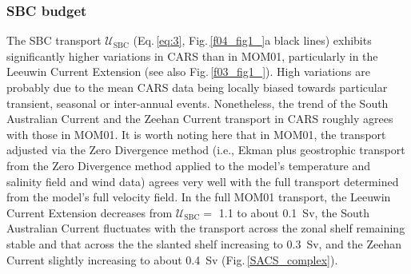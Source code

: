 \documentclass[preprint,3p,review,12pt]{elsarticle}
\newcommand{\sub}[1]{_{\text{#1}}}
\begin{document}
\subsubsection{SBC budget}\label{SBC budget}
The SBC transport $\mathcal{U}\sub{SBC}$ (Eq.\,\ref{eq:3}, Fig.\,\ref{f04_fig1_}a black lines) exhibits significantly higher variations in CARS than in MOM01, particularly in the Leeuwin Current Extension (see also Fig.\,\ref{f03_fig1_}).
High variations are probably due to the mean CARS data being locally biased towards particular transient, seasonal or inter-annual events. Nonetheless, the trend of the South Australian Current and the Zeehan Current transport in CARS
roughly agrees with those in MOM01. It is worth noting here that in MOM01, the transport adjusted via the Zero Divergence method (i.e., Ekman plus geostrophic transport from the Zero Divergence method applied to the model's temperature and salinity field and wind data) agrees very well with the full transport determined from the model's full velocity field. In the full MOM01 transport, the Leeuwin Current Extension decreases from $\mathcal{U}\sub{SBC} =$ \num{1.1} to about \SI{0.1}{Sv}, the South Australian Current fluctuates with the transport across the zonal shelf remaining stable and that across the the slanted shelf increasing to \SI{0.3}{Sv}, and the Zeehan Current slightly increasing to about \SI{0.4}{Sv} (Fig.\,\ref{SACS_complex}).
%
\end{document}
